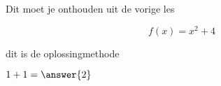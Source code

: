 \documentclass{ximera}
\begin{document}

\begin{template}
    Dit moet je onthouden uit de vorige les
\end{template}

\begin{exercise}
    \[f(x)=x^2+4\]
    \begin{oplossing}
        dit is de oplossingmethode
    \end{oplossing}
\end{exercise}

\begin{exercise}
    $1+1=\answer{2}$
\end{exercise}
\end{document}
